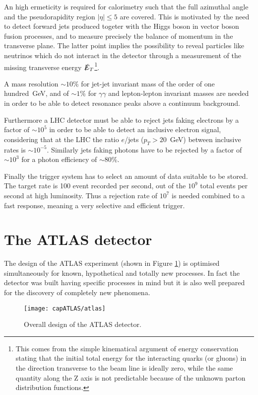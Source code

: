 An high ermeticity is required for calorimetry such that the full azimuthal angle and the pseudorapidity region $|\eta| \leq 5$ are covered. This is motivated by the need to detect forward jets produced togeter with the Higgs boson in vector boson fusion processes, and to measure precisely the balance of momentum in the transverse plane. The latter point implies the possibility to reveal  particles like neutrinos which do not interact in the detector through a measurement of the missing transverse energy $\slashed{E}_{T}$\footnote{This comes from the simple kinematical argument of energy conservation stating that the initial total energy for the interacting quarks (or gluons) in the direction transverse to the beam line is ideally zero, while the same quantity along the Z axis is not predictable because of the unknown parton distribution functions.}. 

A mass resolution $\sim 10$\% for jet-jet invariant mass  of the order of one hundred~GeV, and of $\sim 1$\% for $\gamma\gamma$ and lepton-lepton invariant masses are needed in order to be able to detect resonance peaks above a continuum background. 

Furthermore a LHC detector must be able to reject jets faking electrons by a factor of $\sim 10^{5}$ in order to be able to detect an inclusive electron signal, considering that at the LHC the ratio $e$/jets ($p_{T} > 20$~GeV) between inclusive rates is $\sim 10^{-5}$. Similarly jets faking photons have to be rejected by a factor of $\sim 10^{3}$ for a photon efficiency of $\sim$80\%.

Finally the trigger system has to select an amount of data suitable to be stored. The target rate is  100 event recorded per second, out of the $10^{9}$ total events per second at high luminosity. Thus a rejection rate of $10^{7}$ is needed combined to a fast response, meaning a very selective and efficient trigger. 


\section{The ATLAS detector}
The design of the ATLAS experiment (shown in Figure \ref{atlas}) is optimised simultaneously for known, hypothetical and totally new processes. In fact the detector was built having specific processes in mind but it is also well prepared for the discovery of completely new phenomena. 
\begin{figure}[htb]\begin{center}
\texttt{[image: capATLAS/atlas]}\caption{Overall design of the ATLAS detector. }\label{atlas}
\end{center}\end{figure}

